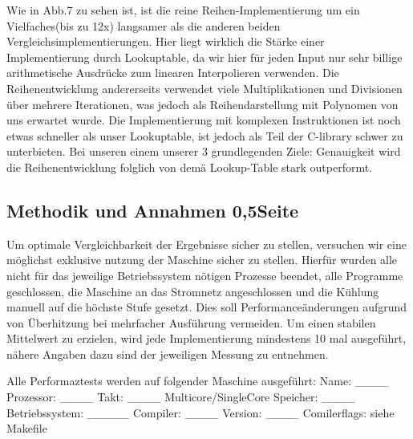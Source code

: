 \documentclass[course=erap] {aspdoc}
\begin{document}

    Wie in Abb.7 zu sehen ist, ist die reine Reihen-Implementierung um ein Vielfaches(bis zu 12x) langsamer als die anderen
    beiden Vergleichsimplementierungen. Hier liegt wirklich die Stärke einer Implementierung durch Lookuptable, da wir hier für jeden
    Input nur sehr billige arithmetische Ausdrücke zum linearen Interpolieren verwenden. Die Reihenentwicklung andererseits verwendet 
    viele Multiplikationen und Divisionen über mehrere Iterationen, was jedoch als Reihendarstellung mit Polynomen von uns erwartet
    wurde. Die Implementierung mit komplexen Instruktionen ist noch etwas schneller als unser Lookuptable, ist jedoch als Teil der 
    C-library schwer zu unterbieten. Bei unseren einem unserer 3 grundlegenden Ziele: Genauigkeit wird die Reihenentwicklung folglich von demä
    Lookup-Table stark outperformt. 

    \subsection{Methodik und Annahmen 0,5Seite}
    Um optimale Vergleichbarkeit der Ergebnisse sicher zu stellen, versuchen wir eine möglichst exklusive nutzung der Maschine sicher zu stellen.
    Hierfür wurden alle nicht für das jeweilige Betriebssystem nötigen Prozesse beendet, alle Programme geschlossen, die Maschine an das Stromnetz angeschlossen und die Kühlung manuell auf die höchste Stufe gesetzt.
    Dies soll Performanceänderungen aufgrund von Überhitzung bei mehrfacher Ausführung vermeiden.
    Um einen stabilen Mittelwert zu erzielen, wird jede Implementierung mindestens 10 mal ausgeführt, nähere Angaben dazu sind der jeweiligen Messung zu entnehmen.

    Alle Performaztests werden auf folgender Maschine ausgeführt: Name: ____ Prozessor: ____ Takt: ____ Multicore/SingleCore Speicher: ____ Betriebssystem: _____ Compiler: ____ Version: ____ Comilerflags: siehe Makefile
\end{document}
